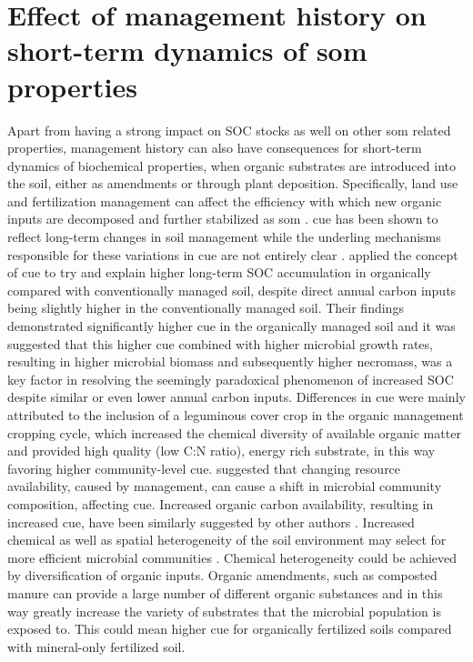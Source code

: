 \documentclass[12pt]{report}
\begin{document}
		\section{Effect of management history on short-term dynamics of \gls{som} properties}
		
		Apart from having a strong impact on SOC stocks as well on other \gls{som} related properties, management history can also have consequences for short-term dynamics of biochemical properties, when organic substrates are introduced into the soil, either as amendments or through plant deposition. Specifically, land use and fertilization management can affect the efficiency with which new organic inputs are decomposed and further stabilized as \gls{som} \citep{lee2014}. \gls{cue} has been shown to reflect long-term changes in soil management  while the underling mechanisms responsible for these variations in \gls{cue} are not entirely clear \citep{kallenbach2019}.
		\citep{kallenbach2015} applied the concept of \gls{cue} to try and explain higher long-term SOC accumulation in organically compared with conventionally managed soil, despite direct annual carbon inputs being slightly higher in the conventionally managed soil. Their findings demonstrated significantly higher \gls{cue} in the organically managed soil and it was suggested that this higher \gls{cue} combined with higher microbial growth rates, resulting in higher microbial biomass and subsequently higher necromass, was a key factor in resolving the seemingly paradoxical phenomenon of increased SOC despite similar or even lower annual carbon inputs. Differences in \gls{cue} were mainly attributed to the inclusion of a leguminous cover crop in the organic management cropping cycle, which increased the chemical diversity of available organic matter and provided high quality (low C:N ratio), energy rich substrate, in this way favoring higher community-level \gls{cue}.
		\citet{roller2015} suggested that changing resource availability, caused by management, can cause a shift in microbial community composition, affecting \gls{cue}. Increased organic carbon availability, resulting in increased \gls{cue}, have been similarly suggested by other authors \citep{cotrufo2013}.
		Increased chemical as well as spatial heterogeneity of the soil environment may select for more efficient microbial communities \citep{pfeiffer2001, nunan2017}. Chemical heterogeneity could be achieved by diversification of organic inputs. Organic amendments, such as composted manure can provide a large number of different organic substances \citep{zbytniewski2005} and in this way greatly increase the  variety of substrates that the microbial population is exposed to. This could mean higher \gls{cue} for organically fertilized soils compared with mineral-only fertilized soil.
\end{document}
